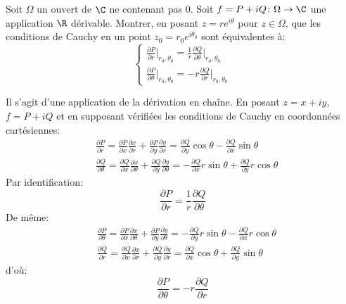 \documentclass[a4paper, 12pt]{amsart}
\begin{document}
\begin{fex}
Soit $\Omega$ un ouvert de $\C$ ne contenant pas $0.$ Soit $f=P + i Q \colon \Omega \to \C$ une application $\R$ dérivable. Montrer, en posant $z=re^{i\theta}$ pour $z \in \Omega$, que les conditions de Cauchy en un point $z_0 = r_0 e^{i \theta_0}$ sont équivalentes à:
\[
\begin{cases}
    \frac{\partial P}{\partial r}\vert_{r_0,\theta_0} = \frac{1}{r}\frac{\partial Q}{\partial \theta}\vert_{r_0,\theta_0} \\
    \frac{\partial P}{\partial \theta}\vert_{r_0,\theta_0} =- r\frac{\partial Q}{\partial r}\vert_{r_0,\theta_0}
\end{cases}
\]
\end{fex}
Il s'agit d'une application de la dérivation en chaîne. En posant $z = x + i y$, $f = P + i Q$ 
et en supposant vérifiées les conditions de Cauchy en coordonnées cartésiennes:
\begin{equation}
\begin{split}
    & \frac{\partial P}{\partial r} = \frac{\partial P}{\partial x}\frac{\partial x}{\partial r} +\frac{\partial P}{\partial y}\frac{\partial y}{\partial r}
    = \frac{\partial Q}{\partial y} \cos \theta -\frac{\partial Q}{\partial x} \sin \theta\\
    & \frac{\partial Q}{\partial \theta} = \frac{\partial Q}{\partial x}\frac{\partial x}{\partial \theta} + \frac{\partial Q}{\partial y}\frac{\partial y}{\partial \theta} = -\frac{\partial Q}{\partial x} r \sin\theta + \frac{\partial Q}{\partial y} r \cos \theta
\end{split}
\end{equation}
Par identification:
\[
\frac{\partial P}{\partial r} = \frac{1}{r}\frac{\partial Q}{\partial \theta}
\]
De même:
\begin{equation}
\begin{split}
    & \frac{\partial P}{\partial \theta} = \frac{\partial P}{\partial x}\frac{\partial x}{\partial \theta} +\frac{\partial P}{\partial y}\frac{\partial y}{\partial \theta}
    = - \frac{\partial Q}{\partial y} r \sin \theta -\frac{\partial Q}{\partial x} r \cos \theta\\
    & \frac{\partial Q}{\partial r} = \frac{\partial Q}{\partial x}\frac{\partial x}{\partial r} + \frac{\partial Q}{\partial y}\frac{\partial y}{\partial r} = \frac{\partial Q}{\partial x}  \cos \theta + \frac{\partial Q}{\partial y} \sin \theta
\end{split}
\end{equation}
d'où:
\[
\frac{\partial P}{\partial \theta} = -r \frac{\partial Q}{\partial r}
\]
\end{document}

